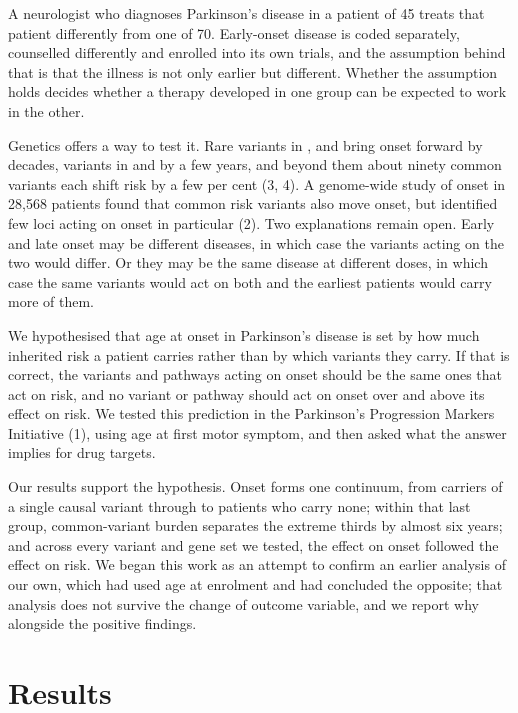 \documentclass[10pt]{article}
\begin{document}
A neurologist who diagnoses Parkinson's disease in a patient of 45 treats that
patient differently from one of 70. Early-onset disease is coded separately,
counselled differently and enrolled into its own trials, and the assumption
behind that is that the illness is not only earlier but different. Whether the
assumption holds decides whether a therapy developed in one group can be
expected to work in the other.

Genetics offers a way to test it. Rare variants in ,  and
 bring onset forward by decades, variants in  and
 by a few years, and beyond them about ninety common variants each
shift risk by a few per cent (3, 4). A genome-wide study of onset in 28,568
patients found that common risk variants also move onset, but identified few
loci acting on onset in particular (2). Two explanations remain open. Early and
late onset may be different diseases, in which case the variants acting on the
two would differ. Or they may be the same disease at different doses, in which
case the same variants would act on both and the earliest patients would carry
more of them.

We hypothesised that age at onset in Parkinson's disease is set by how much
inherited risk a patient carries rather than by which variants they carry. If
that is correct, the variants and pathways acting on onset should be the same
ones that act on risk, and no variant or pathway should act on onset over and
above its effect on risk. We tested this prediction in the Parkinson's
Progression Markers Initiative (1), using age at first motor symptom, and then
asked what the answer implies for drug targets.

Our results support the hypothesis. Onset forms one continuum, from carriers of a single causal variant through to patients who carry none; within that last group, common-variant burden separates the extreme thirds by almost six years; and across every variant and gene set we tested, the effect on onset followed the effect on risk. We began this work as an attempt to confirm an earlier analysis of our own,
which had used age at enrolment and had concluded the opposite; that analysis
does not survive the change of outcome variable, and we report why alongside the
positive findings.

\section*{Results}
\end{document}

